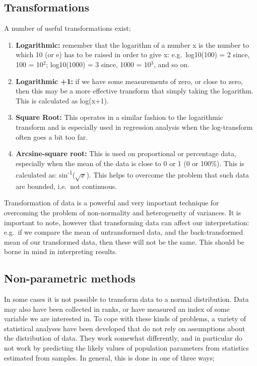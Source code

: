 \documentclass[
]{book}
\providecommand{\tightlist}{%
  \setlength{\itemsep}{0pt}\setlength{\parskip}{0pt}}
\begin{document}
\hypertarget{transformations}{%
\subsection*{Transformations}\label{transformations}}

A number of useful transformations exist;

\begin{enumerate}
\def\labelenumi{\arabic{enumi})}
\tightlist
\item
  \textbf{Logarithmic:} remember that the logarithm of a number x is the number to which 10 (or e) has to be raised in order to give x: e.g.~log10(100) = 2 since, 100 = 10\(^2\); log10(1000) = 3 since, 1000 = 10\(^3\), and so on.
\item
  \textbf{Logarithmic +1:} if we have some measurements of zero, or close to zero, then this may be a more effective transform that simply taking the logarithm. This is calculated as log(x+1).
\item
  \textbf{Square Root:} This operates in a similar fashion to the logarithmic transform and is especially used in regression analysis when the log-transform often goes a bit too far.
\item
  \textbf{Arcsine-square root:} This is used on proportional or percentage data, especially when the mean of the data is close to 0 or 1 (0 or 100\%). This is calculated as: sin\textsuperscript{-1}(\(\sqrt{x}\)). This helps to overcome the problem that such data are bounded, i.e.~not continuous.
\end{enumerate}

Transformation of data is a powerful and very important technique for overcoming the problem of non-normality and heterogeneity of variances. It is important to note, however that transforming data can affect our interpretation: e.g.~if we compare the mean of untransformed data, and the back-transformed mean of our transformed data, then these will not be the same. This should be borne in mind in interpreting results.

\hypertarget{non-parametric-methods}{%
\subsection*{Non-parametric methods}\label{non-parametric-methods}}

In some cases it is not possible to transform data to a normal distribution. Data may also have been collected in ranks, or have measured an index of some variable we are interested in. To cope with these kinds of problems, a variety of statistical analyses have been developed that do not rely on assumptions about the distribution of data. They work somewhat differently, and in particular do not work by predicting the likely values of population parameters from statistics estimated from samples. In general, this is done in one of three ways;
\end{document}
